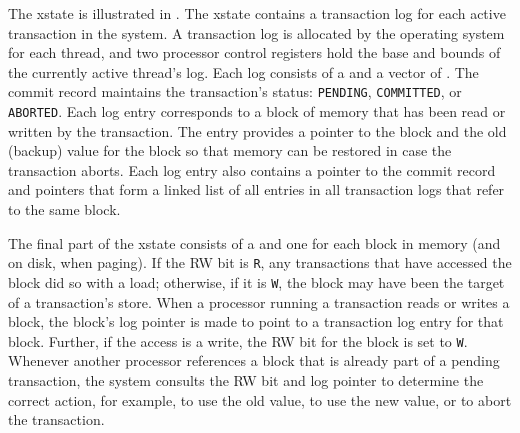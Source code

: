 The xstate is illustrated in .  The xstate
contains a transaction log for each active transaction in the system.
A transaction log is allocated by the operating system for each
thread, and two processor control registers hold the base and bounds
of the currently active thread's log.  Each log consists of a
 and a vector of .  The commit
record maintains the transaction's status: \texttt{PENDING},
\texttt{COMMITTED}, or \texttt{ABORTED}.  Each log entry corresponds
to a block of memory that has been read or written by the transaction.
The entry provides a pointer to the block and the old (backup) value
for the block so that memory can be restored in case the transaction
aborts.  Each log entry also contains a pointer to the commit record
and pointers that form a linked list of all entries in all transaction
logs that refer to the same block.

The final part of the xstate consists of a  and one
 for each block in memory (and on disk, when paging).  If
the RW bit is \texttt{R}, any transactions that have accessed the
block did so with a load; otherwise, if it is \texttt{W}, the block
may have been the target of a transaction's store.  When a processor
running a transaction reads or writes a block, the block's log pointer
is made to point to a transaction log entry for that block.  Further,
if the access is a write, the RW bit for the block is set to
\texttt{W}.  Whenever another processor references a block that is
already part of a pending transaction, the system consults the RW bit
and log pointer to determine the correct action, for example, to use
the old value, to use the new value, or to abort the transaction.



